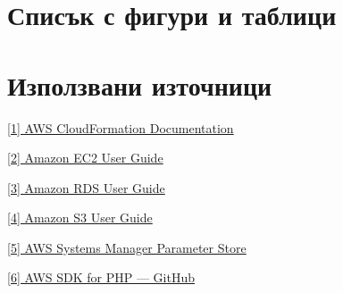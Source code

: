 \documentclass[12pt]{article}
\begin{document}
\section{Списък с фигури и таблици}

\listoftables
\listoffigures


\section{Използвани източници}

\noindent\href{https://docs.aws.amazon.com/cloudformation/}{[1] AWS CloudFormation Documentation}

\medskip

\noindent\href{https://docs.aws.amazon.com/AWSEC2/latest/UserGuide/}{[2] Amazon EC2 User Guide}

\medskip

\noindent\href{https://docs.aws.amazon.com/AmazonRDS/latest/UserGuide/}{[3] Amazon RDS User Guide}

\medskip

\noindent\href{https://docs.aws.amazon.com/AmazonS3/latest/userguide/}{[4] Amazon S3 User Guide}

\medskip

\noindent\href{https://docs.aws.amazon.com/systems-manager/latest/userguide/systems-manager-parameter-store.html}{[5] AWS Systems Manager Parameter Store}

\medskip

\noindent\href{https://github.com/aws/aws-sdk-php}{[6] AWS SDK for PHP — GitHub}
\end{document}
